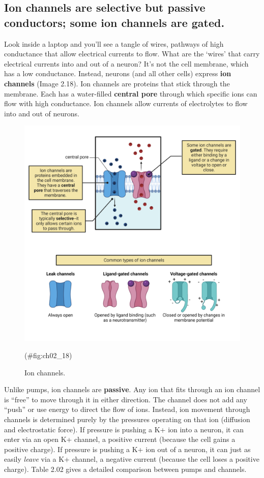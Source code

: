 \documentclass[
]{book}
\begin{document}
\hypertarget{ion-channels-are-selective-but-passive-conductors-some-ion-channels-are-gated.}{%
\subsection{Ion channels are selective but passive conductors; some ion channels are gated.}\label{ion-channels-are-selective-but-passive-conductors-some-ion-channels-are-gated.}}

Look inside a laptop and you'll see a tangle of wires, pathways of high conductance that allow electrical currents to flow. What are the `wires' that carry electrical currents into and out of a neuron? It's not the cell membrane, which has a low conductance. Instead, neurons (and all other cells) express \textbf{ion channels }(Image 2.18). Ion channels are proteins that stick through the membrane. Each has a water-filled \textbf{central pore} through which specific ions can flow with high conductance. Ion channels allow currents of electrolytes to flow into and out of neurons.

\begin{figure}

{\centering \includegraphics[width=0.8\linewidth]{images/ch02/02_18} 

}

\caption{Ion channels.}(\#fig:ch02_18)
\end{figure}

Unlike pumps, ion channels are \textbf{passive}. Any ion that fits through an ion channel is ``free'' to move through it in either direction. The channel does not add any ``push'' or use energy to direct the flow of ions. Instead, ion movement through channels is determined purely by the pressures operating on that ion (diffusion and electrostatic force). If pressure is pushing a K+ ion into a neuron, it can enter via an open K+ channel, a positive current (because the cell gains a positive charge). If pressure is pushing a K+ ion out of a neuron, it can just as easily \emph{leave} via a K+ channel, a negative current (because the cell loses a positive charge). Table 2.02 gives a detailed comparison between pumps and channels.
\end{document}
